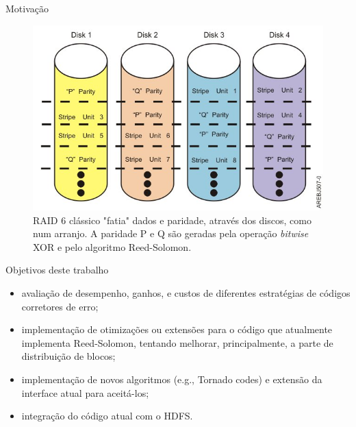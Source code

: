   \begin{frame}{Motivação}
   \begin{figure}[h]
     \centering
     \includegraphics[scale=.4]{raid6.jpg}
     \caption{RAID 6 clássico "fatia" dados e paridade, através dos discos, como num arranjo. A paridade P e Q são geradas pela operação \emph{bitwise} XOR e pelo algoritmo Reed-Solomon.\cite{IBMR6:2012}}
     \label{fig6:raid6}
   \end{figure}
  \end{frame}

  \begin{frame}{Objetivos deste trabalho}

  \begin{itemize}
     \item avaliação de desempenho, ganhos, e custos de diferentes
  estratégias de códigos corretores de erro;
     \item implementação de otimizações ou extensões para o código que
  atualmente implementa Reed-Solomon, tentando melhorar,
  principalmente, a parte de distribuição de blocos;
     \item implementação de novos algoritmos (e.g., Tornado codes) e
  extensão da interface atual para aceitá-los;
     \item integração do código atual com o HDFS.
     \end{itemize}
  \end{frame}

